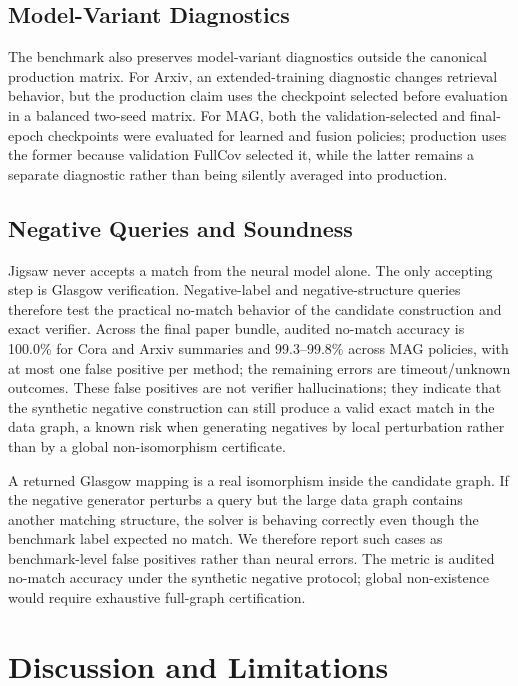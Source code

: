 \documentclass[runningheads]{llncs}
\begin{document}
\subsection{Model-Variant Diagnostics}

The benchmark also preserves model-variant diagnostics outside the canonical production matrix. For Arxiv, an extended-training diagnostic changes retrieval behavior, but the production claim uses the checkpoint selected before evaluation in a balanced two-seed matrix. For MAG, both the validation-selected and final-epoch checkpoints were evaluated for learned and fusion policies; production uses the former because validation FullCov selected it, while the latter remains a separate diagnostic rather than being silently averaged into production.

\subsection{Negative Queries and Soundness}

Jigsaw never accepts a match from the neural model alone. The only accepting step is Glasgow verification. Negative-label and negative-structure queries therefore test the practical no-match behavior of the candidate construction and exact verifier. Across the final paper bundle, audited no-match accuracy is 100.0\% for Cora and Arxiv summaries and 99.3--99.8\% across MAG policies, with at most one false positive per method; the remaining errors are timeout/unknown outcomes. These false positives are not verifier hallucinations; they indicate that the synthetic negative construction can still produce a valid exact match in the data graph, a known risk when generating negatives by local perturbation rather than by a global non-isomorphism certificate.

A returned Glasgow mapping is a real isomorphism inside the candidate graph. If the negative generator perturbs a query but the large data graph contains another matching structure, the solver is behaving correctly even though the benchmark label expected no match. We therefore report such cases as benchmark-level false positives rather than neural errors. The metric is audited no-match accuracy under the synthetic negative protocol; global non-existence would require exhaustive full-graph certification.

\section{Discussion and Limitations}
\label{sec:limits}
\end{document}
